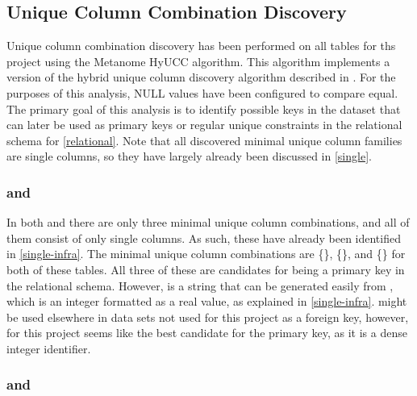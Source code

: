 
\subsection{Unique Column Combination Discovery} \label{ucc}

Unique column combination discovery has been performed on all tables for ths project using the Metanome HyUCC algorithm. This algorithm implements a version of the hybrid unique column discovery algorithm described in \cite{papenbrock2017hybrid}. For the purposes of this analysis, NULL values have been configured to compare equal. The primary goal of this analysis is to identify possible keys in the dataset that can later be used as primary keys or regular unique constraints in the relational schema for \cref{relational}. Note that all discovered minimal unique column families are single columns, so they have largely already been discussed in \cref{single}.


\subsubsection{\texorpdfstring{ and }{bz\_infrastructure\_line and bz\_infrastructure\_node}} \label{ucc-infra}

In both  and  there are only three minimal unique column combinations, and all of them consist of only single columns. As such, these have already been identified in \cref{single-infra}.
The minimal unique column combinations are \{\}, \{\}, and \{\} for both of these tables.
All three of these are candidates for being a primary key in the relational schema. However,  is a string that can be generated easily from , which is an integer formatted as a real value, as explained in \cref{single-infra}.  might be used elsewhere in data sets not used for this project as a foreign key, however, for this project  seems like the best candidate for the primary key, as it is a dense integer identifier.


\subsubsection{\texorpdfstring{ and }{bz\_hazard\_landslide and bz\_hazard\_avalanche}}

